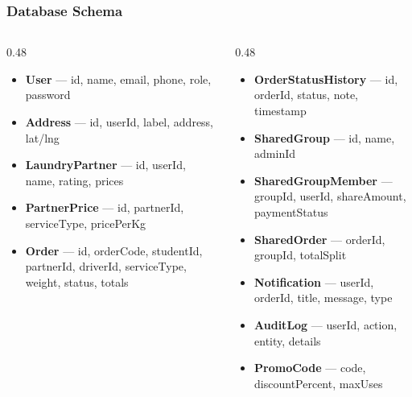 \documentclass[aspectratio=169,professionalfonts,10pt]{beamer}
\begin{document}
\begin{frame}
    \frametitle{Database Schema}
    \scriptsize
    \begin{columns}[T]
        \begin{column}{0.48\textwidth}
            \begin{tcolorbox}[colback=ugmLightGrey,colframe=ugmBlue,title=\small Core Models]
                \begin{itemize}\setlength{\itemsep}{0pt}
                    \item \textbf{User} --- id, name, email, phone, role, password
                    \item \textbf{Address} --- id, userId, label, address, lat/lng
                    \item \textbf{LaundryPartner} --- id, userId, name, rating, prices
                    \item \textbf{PartnerPrice} --- id, partnerId, serviceType, pricePerKg
                    \item \textbf{Order} --- id, orderCode, studentId, partnerId, driverId, serviceType, weight, status, totals
                \end{itemize}
            \end{tcolorbox}
        \end{column}

        \begin{column}{0.48\textwidth}
            \begin{tcolorbox}[colback=ugmLightGrey,colframe=ugmBlue,title=\small Supporting Models]
                \begin{itemize}\setlength{\itemsep}{0pt}
                    \item \textbf{OrderStatusHistory} --- id, orderId, status, note, timestamp
                    \item \textbf{SharedGroup} --- id, name, adminId
                    \item \textbf{SharedGroupMember} --- groupId, userId, shareAmount, paymentStatus
                    \item \textbf{SharedOrder} --- orderId, groupId, totalSplit
                    \item \textbf{Notification} --- userId, orderId, title, message, type
                    \item \textbf{AuditLog} --- userId, action, entity, details
                    \item \textbf{PromoCode} --- code, discountPercent, maxUses
                \end{itemize}
            \end{tcolorbox}
        \end{column}
    \end{columns}
\end{frame}
\end{document}
